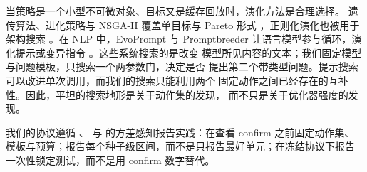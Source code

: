 当策略是一个小型不可微对象、目标又是缓存回放时，演化方法是合理选择。
遗传算法、进化策略与 NSGA-II 覆盖单目标与 Pareto 形式
\citep{deb2002nsga2,hansen2001cmaes,stanley2002neat}，正则化演化也被用于
架构搜索 \citep{real2019regularized,elsken2019nas}。在 NLP 中，EvoPrompt 与
Promptbreeder 让语言模型参与循环，演化提示或变异指令
\citep{guo2024evoprompt,fernando2024promptbreeder}。这些系统搜索的是改变
模型所见内容的文本；我们固定模型与问题模板，只搜索一个两参数门，决定是否
提出第二个带类型问题。提示搜索可以改进单次调用，而我们的搜索只能利用两个
固定动作之间已经存在的互补性。因此，平坦的搜索地形是关于动作集的发现，
而不只是关于优化器强度的发现。

我们的协议遵循 \citet{henderson2018matters}、\citet{bouthillier2021variance}
与 \citet{dodge2019show} 的方差感知报告实践：在查看 confirm 之前固定动作集、
模板与预算；报告每个种子级区间，而不是只报告最好单元；在冻结协议下报告
一次性锁定测试，而不是用 confirm 数字替代。
